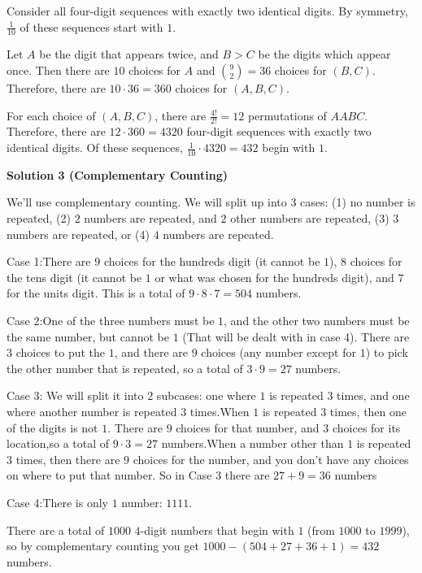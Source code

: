 \begin{enumerate}
Consider all four-digit sequences with exactly two identical digits. By symmetry, $\frac{1}{10}$ of these sequences start with $1$.

 Let $A$ be the digit that appears twice, and $B > C$ be the digits which appear once. Then there are $10$ choices for $A$ and $\binom{9}{2} = 36$ choices for $(B, C)$.  Therefore, there are $10 \cdot 36 = 360$ choices for $(A, B, C)$.

 For each choice of $(A, B, C)$, there are $\frac{4!}{2!} = 12$ permutations of $AABC$.  Therefore, there are $12 \cdot 360 = 4320$ four-digit sequences with exactly two identical digits.  Of these sequences, $\frac{1}{10} \cdot 4320 = \boxed{432}$ begin with $1$.

 



\textbf{Solution 3 (Complementary Counting)}

We'll use complementary counting. We will split up into $3$ cases: (1) no number is repeated, (2) $2$ numbers are repeated, and $2$ other numbers are repeated, (3) $3$ numbers are repeated, or (4) $4$ numbers are repeated.

 Case 1:There are $9$ choices for the hundreds digit (it cannot be $1$), $8$ choices for the tens digit (it cannot be $1$ or what was chosen for the hundreds digit), and $7$ for the units digit. This is a total of $9\cdot8\cdot7=504$ numbers.

 Case 2:One of the three numbers must be $1$, and the other two numbers must be the same number, but cannot be $1$ (That will be dealt with in case 4). There are $3$ choices to put the $1$, and there are $9$ choices (any number except for $1$) to pick the other number that is repeated, so a total of $3\cdot9=27$ numbers.

 Case 3: We will split it into $2$ subcases: one where $1$ is repeated $3$ times, and one where another number is repeated $3$ times.When $1$ is repeated $3$ times, then one of the digits is not $1$. There are $9$ choices for that number, and $3$ choices for its location,so a total of $9\cdot3=27$ numbers.When a number other than $1$ is repeated $3$ times, then there are $9$ choices for the number, and you don't have any choices on where to put that number. So in Case 3 there are $27+9=36$ numbers

 Case 4:There is only $1$ number: $1111$.

 There are a total of $1000$ $4$-digit numbers that begin with $1$ (from $1000$ to $1999$), so by complementary counting you get $1000-(504+27+36+1)=\boxed{432}$ numbers.


\end{enumerate}
